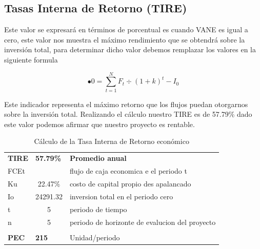 \documentclass[a4paper,openright,12pt]{book}
\begin{document}
\subsection{Tasas Interna de Retorno (TIRE)}

Este valor se expresará en términos de porcentual es cuando VANE es igual a cero, este valor nos muestra el máximo rendimiento que se obtendrá sobre la inversión total, para determinar dicho valor debemos remplazar los valores en la siguiente formula

\begin{equation}
•0=\sum^{N}_{t=1}F_{t}\div(1+k)^{t} - I_{0}
\end{equation}
 
Este indicador representa el máximo retorno que los flujos puedan otorgarnos sobre la inversión total. Realizando el cálculo nuestro TIRE es de 57.79\%   dado este valor podemos afirmar que nuestro proyecto es rentable. 

\begin{table}[H]
\begin{tabular}{lclllll}
\textbf{TIRE} & \multicolumn{1}{l}{\textbf{57.79\%}} & \multicolumn{5}{l}{\textbf{Promedio   anual}}                      \\
FCEt          &                                      & \multicolumn{5}{l}{flujo de caja economica e el periodo t}         \\
Ku            & 22.47\%                              & \multicolumn{5}{l}{costo de capital propio des apalancado}         \\
Io            & 24291.32                             & \multicolumn{5}{l}{inversion total en el periodo cero}             \\
t             & 5                                    & \multicolumn{5}{l}{periodo de tiempo}                              \\
n             & 5                                    & \multicolumn{5}{l}{periodo de horizonte de evalucion del proyecto} \\
              &                                      & \multicolumn{5}{l}{}                                               \\
\textbf{PEC}  & \multicolumn{1}{l}{\textbf{215}}     & \multicolumn{5}{l}{Unidad/periodo}                                
\end{tabular}
\caption{Cálculo de la Tasa Interna de Retorno económico}
\label{Tabla15}
\end{table}
\end{document}
